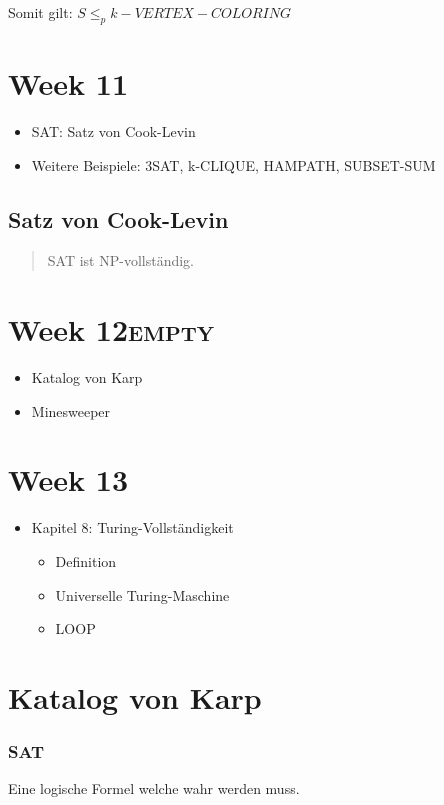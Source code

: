 \documentclass[11pt,twoside,landscape]{article}
\begin{document}
\begin{multicols}{3}
Somit gilt: \(S \leq_p k-VERTEX-COLORING\)

\section*{Week 11}
\label{sec:org57e4a7b}
\begin{itemize}
\item SAT: Satz von Cook-Levin
\item Weitere Beispiele: 3SAT, k-CLIQUE, HAMPATH, SUBSET-SUM
\end{itemize}


\subsection*{Satz von Cook-Levin}
\label{sec:org91c66c4}
\begin{quote}
SAT ist NP-vollständig.
\end{quote}

\section*{Week 12\hfill{}\textsc{empty}}
\label{sec:orgf8e62dd}
\begin{itemize}
\item Katalog von Karp
\item Minesweeper
\end{itemize}

\section*{Week 13}
\label{sec:org038b598}
\begin{itemize}
\item Kapitel 8: Turing-Vollständigkeit
\begin{itemize}
\item Definition
\item Universelle Turing-Maschine
\item LOOP
\end{itemize}
\end{itemize}







\newpage
\section*{Katalog von Karp}
\label{sec:org55363f1}
\subsubsection*{SAT}
\label{sec:org48806fd}
Eine logische Formel welche wahr werden muss.

\end{multicols}
\end{document}
